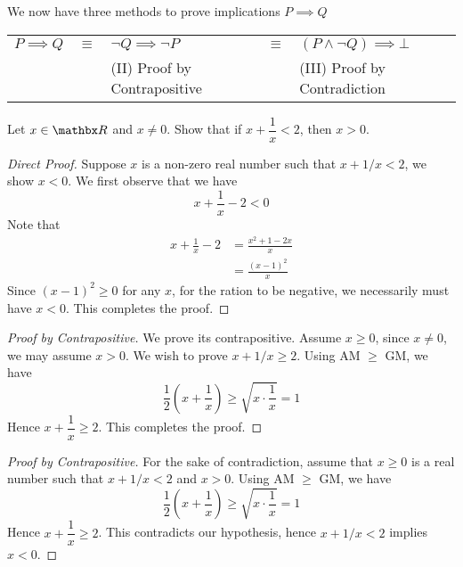 \begin{discussion}
We now have three methods to prove implications $P \implies Q$
\begin{center}
\begin{tabular}{>{\centering}m{1.75cm} >{\centering}m{0.5cm} >{\centering}m{2cm} >{\centering}m{0.5cm} >{\centering\arraybackslash}m{2.75cm}}
$P \implies Q$ & $\equiv$ & $\neg Q \implies \neg P$ & $\equiv$ & $(P \wedge \neg Q) \implies \bot$\\
{\scriptsize(I) Direct Proof} && {\scriptsize(II) Proof by Contrapositive} && {\scriptsize(III) Proof by Contradiction}\\
\end{tabular}
\end{center}
\end{discussion}

\vspace*{1em}

\begin{example}
Let $x \in \rr$ and $x \neq 0$. Show that if $x + \dfrac{1}{x} < 2$, then $x > 0$.
\end{example}
\begin{proof}[Direct Proof]
Suppose $x$ is a non-zero real number such that $x + 1/x < 2$, we show $x < 0$. We first observe that we have
\[x + \frac{1}{x} - 2 < 0\]
Note that
\begin{align*}
x + \frac{1}{x} - 2 &= \frac{x^2 + 1 - 2x}{x}\\[0.5em]
&= \frac{(x-1)^2}{x}
\end{align*}
Since $(x - 1)^2 \geq 0$ for any $x$, for the ration to be negative, we necessarily must have $x< 0$. This completes the proof.
\end{proof}
\vspace*{0.2em}
\begin{proof}[Proof by Contrapositive]
We prove its contrapositive. Assume $x \geq 0$, since $x\neq 0$, we may assume $x > 0$. We wish to prove $x + 1/x \geq 2$. Using AM $\geq$ GM, we have
\[\frac{1}{2}\left(x + \frac{1}{x}\right) \geq \sqrt{x\cdot \frac{1}{x}} = 1\]
Hence $x + \dfrac{1}{x} \geq 2$. This completes the proof.
\end{proof}
\vspace*{0.2em}
\begin{proof}[Proof by Contrapositive]
For the sake of contradiction, assume that $x \geq 0$ is a real number such that $x + 1/x < 2$ and $x > 0$. Using AM $\geq$ GM, we have
\[\frac{1}{2}\left(x + \frac{1}{x}\right) \geq \sqrt{x\cdot \frac{1}{x}} = 1\]
Hence $x + \dfrac{1}{x} \geq 2$. This contradicts our hypothesis, hence $x + 1/x < 2$ implies $x < 0$.
\end{proof}


